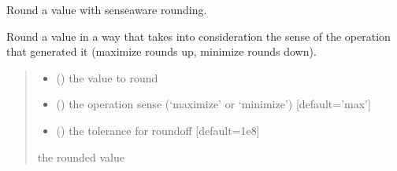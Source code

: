 \documentclass[letterpaper,12pt,english]{sphinxmanual}
\begin{document}
\begin{fulllineitems}
\label{\detokenize{api/core:cbmpy.CBTools.roundOffWithSense}}
\pysigstartsignatures
\pysiglinewithargsret
{}
{\sphinxparamcomma {}\sphinxparamcomma {}}
{}
\pysigstopsignatures
\sphinxAtStartPar
Round a value with sense\sphinxhyphen{}aware rounding.

\sphinxAtStartPar
Round a value in a way that takes into consideration the sense of the
operation that generated it (maximize rounds up, minimize rounds down).
\begin{quote}\begin{description}
\begin{itemize}
\item {} 
\sphinxAtStartPar
{} () \textendash{} the value to round

\item {} 
\sphinxAtStartPar
{} (\sphinxstyleliteralemphasis{\sphinxupquote{, }}) \textendash{} the operation sense (‘maximize’ or ‘minimize’) {[}default=’max’{]}

\item {} 
\sphinxAtStartPar
{} (\sphinxstyleliteralemphasis{\sphinxupquote{, }}) \textendash{} the tolerance for roundoff {[}default=1e\sphinxhyphen{}8{]}

\end{itemize}

\sphinxAtStartPar
{} \textendash{} the rounded value

\end{description}\end{quote}

\end{fulllineitems}
\end{document}
